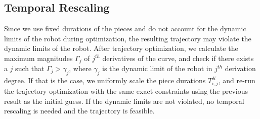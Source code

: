 \documentclass{svproc}
\newcommand{\vp}{\mathbf{p}}
\newcommand{\vg}{\mathbf{g}}
\newcommand{\vf}{\mathbf{f}}
\begin{document}







\subsection{Temporal Rescaling}  \label{temporalRescaling} %
Since we use fixed durations of the pieces and do not account for the dynamic limits of the robot during optimization, the resulting trajectory may violate the dynamic limits of the robot.
After trajectory optimization, we calculate the maximum magnitudes $\Gamma_j$ of $j^{th}$ derivatives of the curve, and check if there exists a $j$ such that $\Gamma_j > \gamma_j$, where $\gamma_j$ is the dynamic limit of the robot in $j^{th}$ derivation degree.
If that is the case, we uniformly scale the piece durations $T^K_{i,j}$, and re-run the trajectory optimization with the same exact constraints using the previous result as the initial guess.
If the dynamic limits are not violated, no temporal rescaling is needed and the trajectory is feasible.
\end{document}
